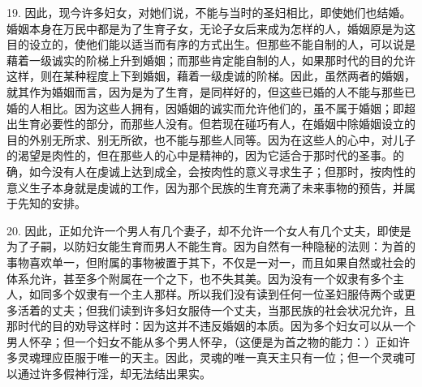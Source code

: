 19. 因此，现今许多妇女，对她们说，不能与当时的圣妇相比，即使她们也结婚。婚姻本身在万民中都是为了生育子女，无论子女后来成为怎样的人，婚姻原是为这目的设立的，使他们能以适当而有序的方式出生。但那些不能自制的人，可以说是藉着一级诚实的阶梯上升到婚姻；而那些肯定能自制的人，如果那时代的目的允许这样，则在某种程度上下到婚姻，藉着一级虔诚的阶梯。因此，虽然两者的婚姻，就其作为婚姻而言，因为是为了生育，是同样好的，但这些已婚的人不能与那些已婚的人相比。因为这些人拥有，因婚姻的诚实而允许他们的，虽不属于婚姻；即超出生育必要性的部分，而那些人没有。但若现在碰巧有人，在婚姻中除婚姻设立的目的外别无所求、别无所欲，也不能与那些人同等。因为在这些人的心中，对儿子的渴望是肉性的，但在那些人的心中是精神的，因为它适合于那时代的圣事。的确，如今没有人在虔诚上达到成全，会按肉性的意义寻求生子；但那时，按肉性的意义生子本身就是虔诚的工作，因为那个民族的生育充满了未来事物的预告，并属于先知的安排。\par

20. 因此，正如允许一个男人有几个妻子，却不允许一个女人有几个丈夫，即使是为了子嗣，以防妇女能生育而男人不能生育。因为自然有一种隐秘的法则：为首的事物喜欢单一，但附属的事物被置于其下，不仅是一对一，而且如果自然或社会的体系允许，甚至多个附属在一个之下，也不失其美。因为没有一个奴隶有多个主人，如同多个奴隶有一个主人那样。所以我们没有读到任何一位圣妇服侍两个或更多活着的丈夫；但我们读到许多妇女服侍一个丈夫，当那民族的社会状况允许，且那时代的目的劝导这样时：因为这并不违反婚姻的本质。因为多个妇女可以从一个男人怀孕；但一个妇女不能从多个男人怀孕，（这便是为首之物的能力：）正如许多灵魂理应臣服于唯一的天主。因此，灵魂的唯一真天主只有一位；但一个灵魂可以通过许多假神行淫，却无法结出果实。\par

